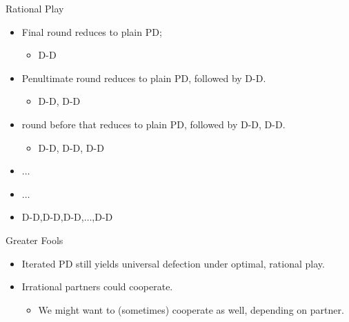 \documentclass[pdf]{beamer}
\begin{document}
\begin{frame}{Rational Play}
  \begin{itemize}
  \item Final round reduces to plain PD;
    \begin{itemize}
      \item D-D
    \end{itemize}
  \pause\item Penultimate round reduces to plain PD, followed by D-D.
    \begin{itemize}
      \item D-D, D-D
    \end{itemize}
  \pause\item round before that reduces to plain PD, followed by D-D, D-D.
    \begin{itemize}
      \item D-D, D-D, D-D
    \end{itemize}
  \pause\item $\ldots$
  \pause\item $\ldots$
  \pause\item D-D,D-D,D-D,$\ldots$,D-D
\end{itemize}
\end{frame}

\begin{frame}{Greater Fools}
  \begin{itemize}
  \item Iterated PD still yields universal defection under optimal, rational play.
  \pause\item Irrational partners could cooperate.
  \begin{itemize}
    \item We might want to (sometimes) cooperate as well, depending on partner.
    \end{itemize}
  \end{itemize}
\end{frame}
\end{document}
